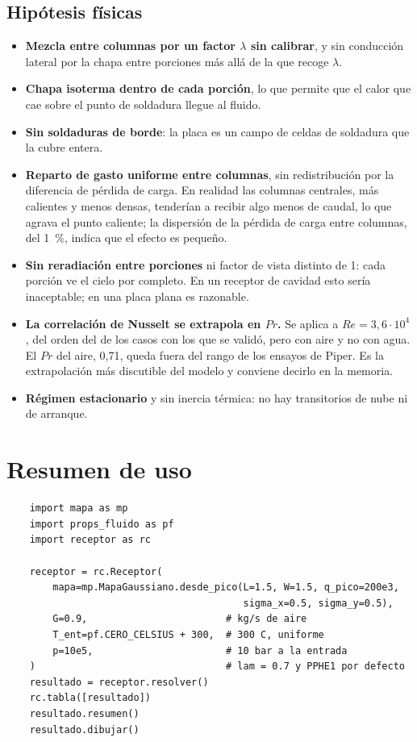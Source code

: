 \documentclass[11pt,a4paper]{article}
\begin{document}
\subsection{Hipótesis físicas}

\begin{itemize}
  \item \textbf{Mezcla entre columnas por un factor $\lambda$ sin calibrar}, y
        sin conducción lateral por la chapa entre porciones más allá de la que
        recoge $\lambda$.
  \item \textbf{Chapa isoterma dentro de cada porción}, lo que permite que el
        calor que cae sobre el punto de soldadura llegue al fluido.
  \item \textbf{Sin soldaduras de borde}: la placa es un campo de celdas de
        soldadura que la cubre entera.
  \item \textbf{Reparto de gasto uniforme entre columnas}, sin redistribución
        por la diferencia de pérdida de carga. En realidad las columnas
        centrales, más calientes y menos densas, tenderían a recibir algo menos
        de caudal, lo que agrava el punto caliente; la dispersión de la pérdida
        de carga entre columnas, del 1~\%, indica que el efecto es pequeño.
  \item \textbf{Sin reradiación entre porciones} ni factor de vista distinto de
        1: cada porción ve el cielo por completo. En un receptor de cavidad esto
        sería inaceptable; en una placa plana es razonable.
  \item \textbf{La correlación de Nusselt se extrapola en $Pr$.} Se aplica a
        $Re = 3{,}6\cdot10^{4}$, del orden del de los casos con los que se validó,
        pero con aire y no con agua. El $Pr$ del aire, 0,71, queda fuera del
        rango de los ensayos de Piper. Es la extrapolación más discutible del
        modelo y conviene decirlo en la memoria.
  \item \textbf{Régimen estacionario} y sin inercia térmica: no hay transitorios
        de nube ni de arranque.
\end{itemize}

\section{Resumen de uso}

\begin{verbatim}
    import mapa as mp
    import props_fluido as pf
    import receptor as rc

    receptor = rc.Receptor(
        mapa=mp.MapaGaussiano.desde_pico(L=1.5, W=1.5, q_pico=200e3,
                                         sigma_x=0.5, sigma_y=0.5),
        G=0.9,                        # kg/s de aire
        T_ent=pf.CERO_CELSIUS + 300,  # 300 C, uniforme
        p=10e5,                       # 10 bar a la entrada
    )                                 # lam = 0.7 y PPHE1 por defecto
    resultado = receptor.resolver()
    rc.tabla([resultado])
    resultado.resumen()
    resultado.dibujar()
\end{verbatim}
\end{document}

